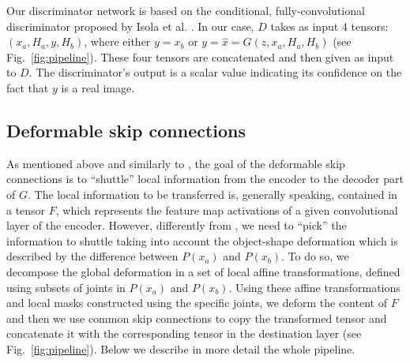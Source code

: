 \documentclass[10pt,twocolumn,letterpaper]{article}
\begin{document}
Our discriminator network is based on the conditional, fully-convolutional 
discriminator proposed by
Isola et al. \cite{pix2pix2016}. In our case, $D$ takes as input 4 tensors: $(x_a, H_a, y, H_b)$, where either  $y =  x_b$ or $y =  \hat{x} = G(z, x_a, H_a, H_b)$ (see Fig.~\ref{fig:pipeline}).
These four tensors are concatenated  and then given as input to $D$. The  discriminator's output is a  scalar value indicating its confidence on the fact that  $y$ is a real image.


\subsection{Deformable skip connections}
\label{skip-connections}

As mentioned above  and similarly to  \cite{pix2pix2016},
the goal of the deformable skip connections is to ``shuttle'' local information from the encoder to the decoder part of $G$. The local information to be transferred is, generally speaking, contained in a tensor $F$, which represents the feature map activations of a given convolutional layer of the encoder.
However, differently from \cite{pix2pix2016}, we need to ``pick''
the information to shuttle taking into account  the object-shape deformation which is  described by the difference between $P(x_a)$ and $P(x_b)$.
To do so, we decompose the global deformation in a set of local affine transformations, defined using subsets of joints in $P(x_a)$ and $P(x_b)$.
Using these affine transformations and local masks constructed using the specific joints, we deform the content of $F$ and then we use common skip connections
to copy the transformed tensor and concatenate it with the corresponding tensor in the destination layer (see  Fig.~\ref{fig:pipeline}).
Below we describe in more detail the whole pipeline.
\end{document}
